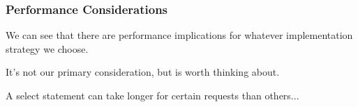 \begin{frame}
\frametitle{Performance Considerations}

We can see that there are performance implications for whatever implementation strategy we choose. 

It's not our primary consideration, but is worth thinking about.

A select statement can take longer for certain requests than others...


\end{frame}






